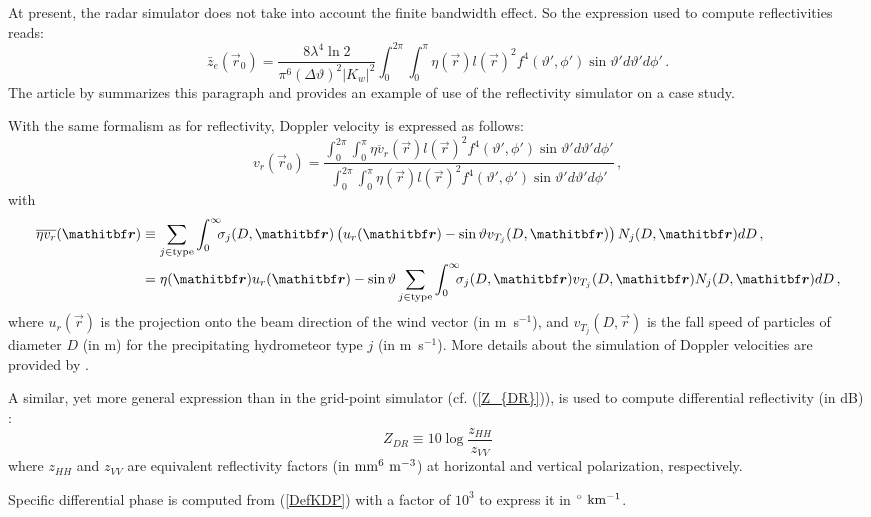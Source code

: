 At present, the radar simulator does not take into account the finite bandwidth effect. So the expression used to compute reflectivities reads:
\begin{equation}
\bar z_e(\vec r_0)=\frac{8\lambda^4\ln2}{\pi^6(\Delta\vartheta)^2|K_w|^2}\int_0^{2\pi}\!\!\!\int_0^\pi\eta(\vec r)l(\vec r)^2f^4(\vartheta',\phi')\sin\vartheta'd\vartheta'd\phi'\,.\label{zefctradiale}
\end{equation}
The article by \citet{Caumont2006} summarizes this paragraph and provides an example of use of the reflectivity simulator on a case study.

With the same formalism as for reflectivity, Doppler velocity is expressed as follows:
\begin{equation}\label{vdopppi}
v_r(\vec r_0)=\frac{\displaystyle\int_0^{2\pi}\!\!\!\int_0^\pi\overline{\eta v_r}(\vec r)l(\vec r)^2f^4(\vartheta',\phi')\sin\vartheta'd\vartheta'd\phi'}{\displaystyle\int_0^{2\pi}\!\!\!\int_0^\pi\eta(\vec r)l(\vec r)^2f^4(\vartheta',\phi')\sin\vartheta'd\vartheta'd\phi'}\,,
\end{equation}
with
\begin{align}
\overline{\eta v_r}(\vec{r})&\equiv\sum_{j\in\rm type}\int_0^\infty\!\!\!\sigma_j(D,\vec{r})\left(u_r(\vec{r})-\sin\vartheta v_{T_j}(D,\vec{r})\right)N_j(D,\vec{r})d D\,,\\
&=\eta(\vec r)u_r(\vec{r})-\sin\vartheta\sum_{j\in\rm type}\int_0^\infty\!\!\!\sigma_j(D,\vec{r})v_{T_j}(D,\vec{r})N_j(D,\vec{r})d D\,,
\end{align}
where $u_r(\vec{r})$ is the projection onto the beam direction of the wind vector (in m~s$^{-1}$), and $v_{T_j}(D,\vec{r})$ is the fall speed of particles of diameter $D$ (in m) for the precipitating hydrometeor type $j$ (in m~s$^{-1}$).
More details about the simulation of Doppler velocities are provided by \citet{Caumont2008}. %

A similar, yet more general expression than in the grid-point simulator (cf. (\ref{Z_{DR}})), is used to compute differential reflectivity (in dB) \citep[see][]{Seliga1976}: %
\begin{equation}
Z_{DR}\equiv10\log\frac{z_{HH}}{z_{VV}}
\end{equation}
where $z_{HH}$ and $z_{VV}$ are equivalent reflectivity factors (in $\rm mm^6~m^{-3}$) at horizontal and vertical polarization, respectively.

Specific differential phase is computed from (\ref{DefKDP}) with a factor of $10^{3}$ to express it in $^\circ\rm~km^{-1}$.

